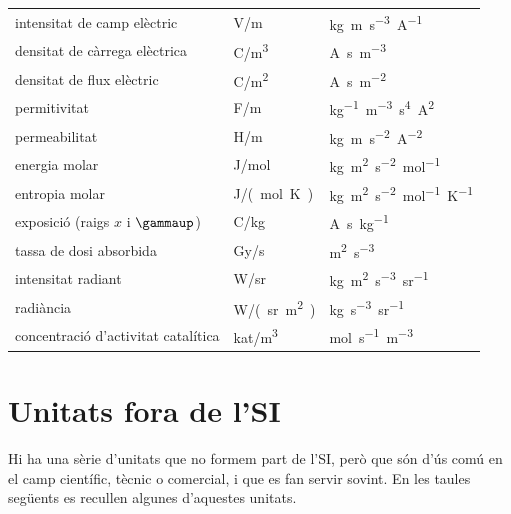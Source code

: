 \begin{longtable}[h]{lll}
   intensitat de camp elèctric & \unit{V/m}& \unit{kg.m.s^{-3}.A^{-1}}  \\
   densitat de càrrega elèctrica & \unit{C/m^3} & \unit{A.s.m^{-3}} \\
   densitat de flux elèctric & \unit{C/m^2} & \unit{A.s.m^{-2}}\\
   permitivitat &  \unit{F/m}& \unit{kg^{-1}.m^{-3}.s^4.A^2} \\
   permeabilitat &  \unit{H/m} & \unit{kg.m.s^{-2}.A^{-2}} \\
   energia molar & \unit{J/mol} & \unit{kg.m^2.s^{-2}.mol^{-1}} \\
   entropia molar& \unit{J/(mol.K)} & \unit{kg.m^2.s^{-2}.mol^{-1}.K^{-1}} \\
   exposició (raigs $x$ i $\gammaup$) & \unit{C/kg} & \unit{A.s.kg^{-1}} \\
   tassa de dosi absorbida & \unit{Gy/s} & \unit{m^2.s^{-3}}\\
   intensitat radiant & \unit{W/sr} & \unit{kg.m^2.s^{-3}.sr^{-1}} \\
   radiància & \unit{W/(sr.m^2)} & \unit{kg.s^{-3}.sr^{-1}} \\
   concentració d'activitat catalítica &  \unit{kat/m^3} & \unit{mol.s^{-1}.m^{-3}}\\
    \bottomrule[1pt]
\end{longtable}



\section{Unitats fora de l'SI}\label{sec:unitats-fora-SI}

Hi ha una sèrie d'unitats que no formem part de l'SI, però que són d'ús comú en el camp científic, tècnic o comercial, i que es fan servir sovint. En les taules següents es recullen algunes d'aquestes unitats.

